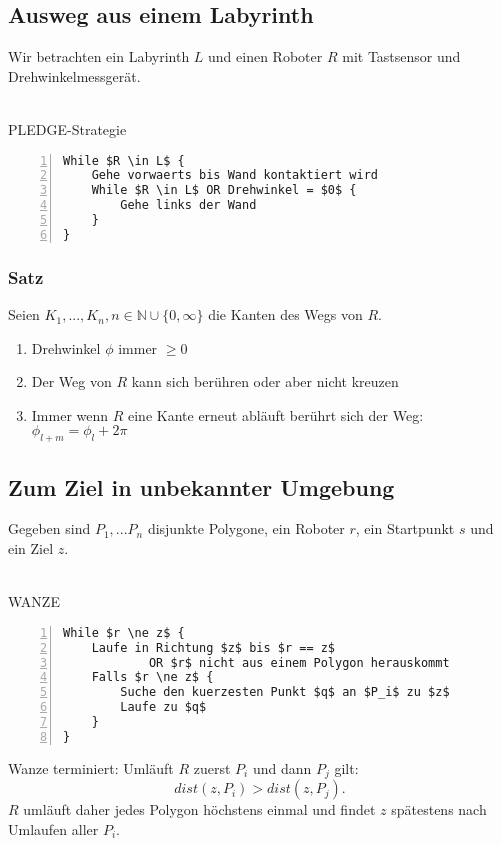 \subsection{Ausweg aus einem Labyrinth}
Wir betrachten ein Labyrinth \(L\) und einen Roboter \(R\) mit Tastsensor und Drehwinkelmessgerät.
\\\\
\begin{minipage}{\textwidth}
PLEDGE-Strategie
\begin{lstlisting}[frame=single,numbers=left,mathescape]
While $R \in L$ {
	Gehe vorwaerts bis Wand kontaktiert wird
	While $R \in L$ OR Drehwinkel = $0$ {
		Gehe links der Wand
	}
}
\end{lstlisting}
\end{minipage}

\subsubsection{Satz}
Seien \(K_1,...,K_n, n \in \mathbb{N} \cup \{0,\infty\}\) die Kanten des Wegs von \(R\).
\begin{enumerate}
	\item Drehwinkel \(\phi\) immer \(\geq 0\)
	\item Der Weg von \(R\) kann sich berühren oder aber nicht kreuzen
	\item Immer wenn \(R\) eine Kante erneut abläuft berührt sich der Weg: \(\phi_{l+m}=\phi_l+2\pi\)
\end{enumerate}


\subsection{Zum Ziel in unbekannter Umgebung}
Gegeben sind \(P_1,...P_n\) disjunkte Polygone, ein Roboter \(r\), ein Startpunkt \(s\) und ein Ziel \(z\).
\\\\
\begin{minipage}{\textwidth}
WANZE
\begin{lstlisting}[frame=single,numbers=left,mathescape]
While $r \ne z$ {
	Laufe in Richtung $z$ bis $r == z$
			OR $r$ nicht aus einem Polygon herauskommt
	Falls $r \ne z$ {
		Suche den kuerzesten Punkt $q$ an $P_i$ zu $z$
		Laufe zu $q$
	}
}
\end{lstlisting}
\end{minipage}
Wanze terminiert: Umläuft \(R\) zuerst \(P_i\) und dann \(P_j\) gilt:
\[dist(z,P_i) > dist(z,P_j).\]
\(R\) umläuft daher jedes Polygon höchstens einmal und findet \(z\) spätestens nach Umlaufen aller \(P_i\).

